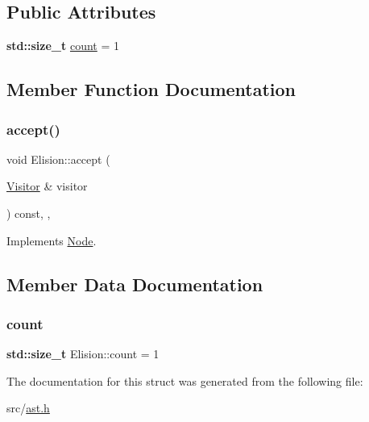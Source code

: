 \subsection*{Public Attributes}
\begin{DoxyCompactItemize}
\item 
\textbf{ std\+::size\+\_\+t} \hyperlink{struct_elision_a95bc7263a799380ca4e4ddc0cc0eb622}{count} = 1
\end{DoxyCompactItemize}


\subsection{Member Function Documentation}
\mbox{\label{struct_elision_ac99f60fccfcedcf9cd090f5682b2e6dd}} 
\subsubsection{\texorpdfstring{accept()}{accept()}}
{\footnotesize\ttfamily void Elision\+::accept (\begin{DoxyParamCaption}\item[{\hyperlink{struct_visitor}{Visitor} \&}]{visitor }\end{DoxyParamCaption}) const\hspace{0.3cm}{\ttfamily [inline]}, {\ttfamily [override]}, {\ttfamily [virtual]}}



Implements \hyperlink{struct_node_a10bd7af968140bbf5fa461298a969c71}{Node}.



\subsection{Member Data Documentation}
\mbox{\label{struct_elision_a95bc7263a799380ca4e4ddc0cc0eb622}} 
\subsubsection{\texorpdfstring{count}{count}}
{\footnotesize\ttfamily \textbf{ std\+::size\+\_\+t} Elision\+::count = 1}



The documentation for this struct was generated from the following file\+:\begin{DoxyCompactItemize}
\item 
src/\hyperlink{ast_8h}{ast.\+h}\end{DoxyCompactItemize}
